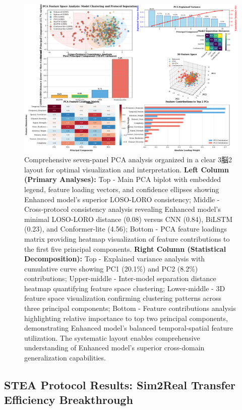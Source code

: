 \documentclass[journal]{IEEEtran}
\begin{document}
\begin{figure}[ht]
\centering
\includegraphics[width=\columnwidth]{figures/figure7_pca_analysis.pdf}
\caption{Comprehensive seven-panel PCA analysis organized in a clear 3脳2 layout for optimal visualization and interpretation. \textbf{Left Column (Primary Analyses):} Top - Main PCA biplot with embedded legend, feature loading vectors, and confidence ellipses showing Enhanced model's superior LOSO-LORO consistency; Middle - Cross-protocol consistency analysis revealing Enhanced model's minimal LOSO-LORO distance (0.08) versus CNN (0.84), BiLSTM (0.23), and Conformer-lite (4.56); Bottom - PCA feature loadings matrix providing heatmap visualization of feature contributions to the first five principal components. \textbf{Right Column (Statistical Decomposition):} Top - Explained variance analysis with cumulative curve showing PC1 (20.1\%) and PC2 (8.2\%) contributions; Upper-middle - Inter-model separation distance heatmap quantifying feature space clustering; Lower-middle - 3D feature space visualization confirming clustering patterns across three principal components; Bottom - Feature contributions analysis highlighting relative importance to top two principal components, demonstrating Enhanced model's balanced temporal-spatial feature utilization. The systematic layout enables comprehensive understanding of Enhanced model's superior cross-domain generalization capabilities.}
\label{fig:pca_analysis}
\end{figure}

\subsection{STEA Protocol Results: Sim2Real Transfer Efficiency Breakthrough}
\end{document}
